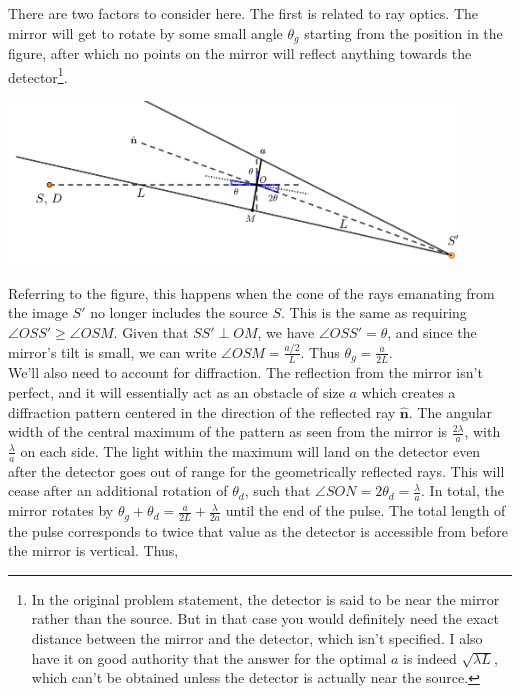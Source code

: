\documentclass[../TST.tex]{subfiles}
\begin{document}
\ifprob \else
	\begin{solution} There are two factors to consider here. The first is related to ray optics. The mirror will get to rotate by some small angle $\theta_g$ starting from the position in the figure, after which no points on the mirror will reflect anything towards the detector\footnote{In the original problem statement, the detector is said to be near the mirror rather than the source. But in that case you would definitely need the exact distance between the mirror and the detector, which isn't specified. I also have it on good authority that the answer for the optimal $a$ is indeed $\sqrt{\lambda L}$, which can't be obtained unless the detector is actually near the source.}.
\end{solution}
\begin{center}
\includegraphics[width=0.9\textwidth]{fig/a2007_l2.pdf}
\end{center}
Referring to the figure, this happens when the cone of the rays emanating from the image $S'$ no longer includes the source $S$. This is the same as requiring $\angle OSS' \geq \angle OSM$. Given that $SS'\perp OM$, we have $\angle OSS'=\theta$, and since the mirror's tilt is small, we can write $\angle OSM = \frac{a/2}{L}$. Thus $\theta_g=\frac{a}{2L}$.\\[5pt]
We'll also need to account for diffraction. The reflection from the mirror isn't perfect, and it will essentially act as an obstacle of size $a$ which creates a diffraction pattern centered in the direction of the reflected ray $\hat{\mathbf{n}}$. The angular width of the central maximum of the pattern as seen from the mirror is $\frac{2\lambda}{a}$, with $\frac{\lambda}{a}$ on each side. The light within the maximum will land on the detector even after the detector goes out of range for the geometrically reflected rays. This will cease after an additional rotation of $\theta_d$, such that $\angle SON = 2\theta_d = \frac{\lambda}{a}$. In total, the mirror rotates by $\theta_g+\theta_d= \frac{a}{2L}+\frac{\lambda}{2a}$ until the end of the pulse. The total length of the pulse corresponds to twice that value as the detector is accessible from before the mirror is vertical. Thus,
\end{document}
